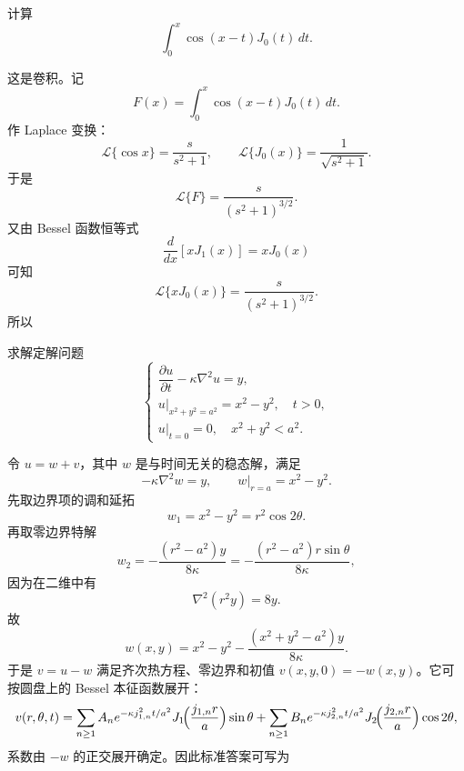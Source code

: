 ﻿

\begin{question}[积分题]

计算
\[
\int_0^x \cos(x-t)J_0(t)\,dt.
\]

\begin{solution}

这是卷积。记
\[
F(x)=\int_0^x \cos(x-t)J_0(t)\,dt.
\]
作 Laplace 变换：
\[
\mathcal L\{\cos x\}=\frac{s}{s^2+1},
\qquad
\mathcal L\{J_0(x)\}=\frac{1}{\sqrt{s^2+1}}.
\]
于是
\[
\mathcal L\{F\}=\frac{s}{(s^2+1)^{3/2}}.
\]
又由 Bessel 函数恒等式
\[
\frac{d}{dx}[xJ_1(x)]=xJ_0(x)
\]
可知
\[
\mathcal L\{xJ_0(x)\}=\frac{s}{(s^2+1)^{3/2}}.
\]
所以

\end{solution}
\end{question}

\begin{question}[圆盘内热方程]

求解定解问题
\[
\begin{cases}
\dfrac{\partial u}{\partial t}-\kappa\nabla^2u=y,\\
u|_{x^2+y^2=a^2}=x^2-y^2,\quad t>0,\\
u|_{t=0}=0,\quad x^2+y^2<a^2.
\end{cases}
\]

\begin{solution}

令 $u=w+v$，其中 $w$ 是与时间无关的稳态解，满足
\[
-\kappa \nabla^2 w=y,
\qquad w|_{r=a}=x^2-y^2.
\]
先取边界项的调和延拓
\[
 w_1=x^2-y^2=r^2\cos 2\theta.
\]
再取零边界特解
\[
 w_2=-\frac{(r^2-a^2)y}{8\kappa}=-\frac{(r^2-a^2)r\sin\theta}{8\kappa},
\]
因为在二维中有
\[
\nabla^2(r^2 y)=8y.
\]
故
\[
 w(x,y)=x^2-y^2-\frac{(x^2+y^2-a^2)y}{8\kappa}.
\]
于是 $v=u-w$ 满足齐次热方程、零边界和初值 $v(x,y,0)=-w(x,y)$。它可按圆盘上的 Bessel 本征函数展开：
\[
 v(r,\theta,t)=
 \sum_{n\ge1}A_n e^{-\kappa j_{1,n}^2 t/a^2}J_1\!\Bigl(\frac{j_{1,n}r}{a}\Bigr)\sin\theta
 +
 \sum_{n\ge1}B_n e^{-\kappa j_{2,n}^2 t/a^2}J_2\!\Bigl(\frac{j_{2,n}r}{a}\Bigr)\cos2\theta,
\]
系数由 $-w$ 的正交展开确定。因此标准答案可写为

\end{solution}
\end{question}

